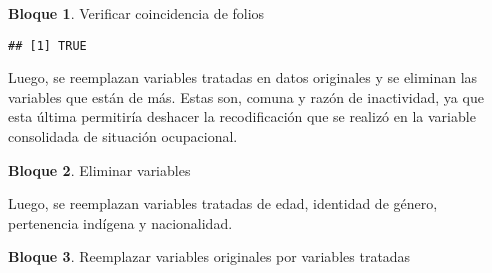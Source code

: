 \documentclass[
]{book}
\newenvironment{Shaded}{\begin{snugshade}}{\end{snugshade}}
\newcommand{\CommentTok}[1]{\textcolor[rgb]{0.56,0.35,0.01}{\textit{#1}}}
\newcommand{\ConstantTok}[1]{\textcolor[rgb]{0.00,0.00,0.00}{#1}}
\newcommand{\FunctionTok}[1]{\textcolor[rgb]{0.00,0.00,0.00}{#1}}
\newcommand{\NormalTok}[1]{#1}
\newcommand{\OtherTok}[1]{\textcolor[rgb]{0.56,0.35,0.01}{#1}}
\newcommand{\SpecialCharTok}[1]{\textcolor[rgb]{0.00,0.00,0.00}{#1}}
\theoremstyle{definition}
\theoremstyle{definition}
\newtheorem{example}{Bloque}[chapter]
\theoremstyle{definition}
\theoremstyle{definition}
\theoremstyle{remark}
\begin{document}
\begin{example}
\protect\hypertarget{exm:bloque92nbm}{}\label{exm:bloque92nbm}Verificar coincidencia de folios
\end{example}

\begin{Shaded}
\end{Shaded}

\begin{verbatim}
## [1] TRUE
\end{verbatim}

Luego, se reemplazan variables tratadas en datos originales y se eliminan las variables que están de más. Estas son, comuna y razón de inactividad, ya que esta última permitiría deshacer la recodificación que se realizó en la variable consolidada de situación ocupacional.

\begin{example}
\protect\hypertarget{exm:bloque93nbm}{}\label{exm:bloque93nbm}Eliminar variables
\end{example}

\begin{Shaded}
\end{Shaded}

Luego, se reemplazan variables tratadas de edad, identidad de género, pertenencia indígena y nacionalidad.

\begin{example}
\protect\hypertarget{exm:bloque94nbm}{}\label{exm:bloque94nbm}Reemplazar variables originales por variables tratadas
\end{example}

\begin{Shaded}
\end{Shaded}
\end{document}

